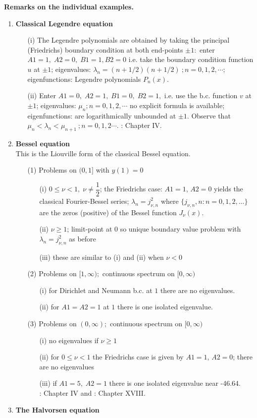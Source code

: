 {\bf Remarks on the individual examples.}
\begin{enumerate}
\item%
{\bf Classical Legendre equation}
\begin{itemize}
\item[(i)]
The Legendre polynomials are obtained by taking the principal
(Friedrichs) boundary condition at both end-points $\pm 1:$ enter $A1=1,
\; A2=0, \; B1 = 1 , B2 = 0 $ i.e. take the boundary condition function
$u$ at $ \pm 1$; eigenvalues:  $\lambda_n
 = (n+1/2 ) (n+ 1/2) \ ; n = 0,1,2, \cdots  $; eigenfunctions:
Legendre polynomials $P_n(x)$.
\item[(ii)]
Enter $A1=0, \; A2 = 1, \; B1 = 0, \; B2=1, $ i.e. use the b.c. function 
$v$ at $\pm 1$;
eigenvalues:  $\mu_n ; n=0,1,2,\cdots $ no explicit formula is available;
eigenfunctions: are logarithmically unbounded at $\pm 1$.  
Observe that $\mu_n < \lambda_n  < \mu_{n+1} \ ; n=0,1,2 \cdots $.  \cite{T}:
Chapter IV.
\end{itemize}
\item %
{\bf Bessel equation}\\
This is the Liouville form of the classical Bessel equation.
\begin{itemize}
\item[(1)]
Problems on $(0,1] $ with $y(1) = 0$
\begin{itemize}
\item[(i)]
$0 \leq \nu < 1 , \; \nu \neq \dfrac{1}{2} $; the Friedrichs case: $A1=1$,
$A2 =0$ yields the classical Fourier-Bessel series; $ \lambda_n = j_{\nu,n}^2 
$ where $\{ j_{\nu,n}, n : n=0,1,2,...\}$ are the zeros (positive) of the
Bessel function $J_{\nu}(x)$.
\item[(ii)]
$\nu  \geq 1$; limit-point at $0$ so unique boundary value problem with $
\lambda_n = j_{\nu,n}^2 $ as before
\item[(iii)]
these are similar to (i) and (ii) when $\nu < 0$
\end{itemize}
\item[(2)]
Problems on $[1, \infty );$ continuous spectrum on $[0, \infty )$
\begin{itemize}
\item[(i)]
for Dirichlet and Neumann b.c. at $1$ there are no eigenvalues.
\item[(ii)]
for $A1 = A2 = 1$ at $1$ there is one isolated eigenvalue.
\end{itemize}
\item[(3)]
Problems on $(0, \infty);$ continuous spectrum on $[0, \infty)$
\begin{itemize}
\item[(i)]
no eigenvalues if $\nu \geq 1$
\item[(ii)]
for $0 \leq \nu < 1 $ the Friedrichs case is given by $A1=1$, $A2=0$;
there are no eigenvalues
\item[(iii)]
if $A1 = 5, \; A2=1$ there is one isolated eigenvalue near -46.64.\\
\hfill \cite{T}: Chapter IV and  \cite{W}: Chapter XVIII.
\end{itemize}
\end{itemize}
\item %
{\bf The Halvorsen equation}


\end{enumerate}
